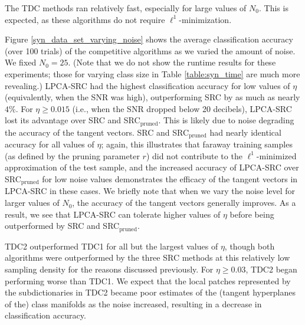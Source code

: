 \documentclass[review]{elsarticle}
\begin{document}
The TDC methods ran relatively fast, especially for large values of $N_0$. This is expected, as these algorithms do not require $\ell^1$-minimization. 

Figure \ref{syn_data_set_varying_noise} shows the average classification accuracy (over 100 trials) of the competitive algorithms as we varied the amount of noise. We fixed $N_0 = 25$. (Note that we do not show the runtime results for these experiments; those for varying class size in Table \ref{table:syn_time} are much more revealing.) LPCA-SRC had the highest classification accuracy for low values of $\eta$ (equivalently, when the SNR was high), outperforming SRC by as much as nearly $4\%$. For $\eta \geq 0.015$ (i.e., when the SNR dropped below 20 decibels), LPCA-SRC lost its advantage over SRC and SRC$_\mathrm{pruned}$. This is likely due to noise degrading the accuracy of the tangent vectors. SRC and SRC$_\mathrm{pruned}$ had nearly identical accuracy for all values of $\eta$; again, this illustrates that faraway training samples (as defined by the pruning parameter $r$) did not contribute to the $\ell^1$-minimized approximation of the test sample, and the increased accuracy of LPCA-SRC over SRC$_\mathrm{pruned}$ for low noise values demonstrates the efficacy of the tangent vectors in LPCA-SRC in these cases. We briefly note that when we vary the noise level for larger values of $N_0$, the accuracy of the tangent vectors generally improves. As a result, we see that LPCA-SRC can tolerate higher values of $\eta$ before being outperformed by SRC and SRC$_\mathrm{pruned}$. 


TDC2 outperformed TDC1 for all but the largest values of $\eta$, though both algorithms were outperformed by the three SRC methods at this relatively low sampling density for the reasons discussed previously. For $\eta \geq 0.03$, TDC2 began performing worse than TDC1. We expect that the local patches represented by the subdictionaries in TDC2 became poor estimates of the (tangent hyperplanes of the) class manifolds as the noise increased, resulting in a decrease in classification accuracy.
\end{document}
